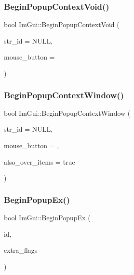 \hypertarget{namespace_im_gui_a87a2228929503fff067d2e167a690751}{}\label{namespace_im_gui_a87a2228929503fff067d2e167a690751} 
\subsubsection{\texorpdfstring{Begin\+Popup\+Context\+Void()}{BeginPopupContextVoid()}}
{\footnotesize\ttfamily bool Im\+Gui\+::\+Begin\+Popup\+Context\+Void (\begin{DoxyParamCaption}\item[{const char $\ast$}]{str\+\_\+id = {\ttfamily NULL},  }\item[{int}]{mouse\+\_\+button = {} }\end{DoxyParamCaption})}

\hypertarget{namespace_im_gui_acf98c99f041ea341d0328e071c56411b}{}\label{namespace_im_gui_acf98c99f041ea341d0328e071c56411b} 
\subsubsection{\texorpdfstring{Begin\+Popup\+Context\+Window()}{BeginPopupContextWindow()}}
{\footnotesize\ttfamily bool Im\+Gui\+::\+Begin\+Popup\+Context\+Window (\begin{DoxyParamCaption}\item[{const char $\ast$}]{str\+\_\+id = {\ttfamily NULL},  }\item[{int}]{mouse\+\_\+button = {},  }\item[{bool}]{also\+\_\+over\+\_\+items = {\ttfamily true} }\end{DoxyParamCaption})}

\hypertarget{namespace_im_gui_a89da3a22300e8293257b6cfdf1b83b7a}{}\label{namespace_im_gui_a89da3a22300e8293257b6cfdf1b83b7a} 
\subsubsection{\texorpdfstring{Begin\+Popup\+Ex()}{BeginPopupEx()}}
{\footnotesize\ttfamily bool Im\+Gui\+::\+Begin\+Popup\+Ex (\begin{DoxyParamCaption}\item[{Im\+Gui\+ID}]{id,  }\item[{Im\+Gui\+Window\+Flags}]{extra\+\_\+flags }\end{DoxyParamCaption})}

